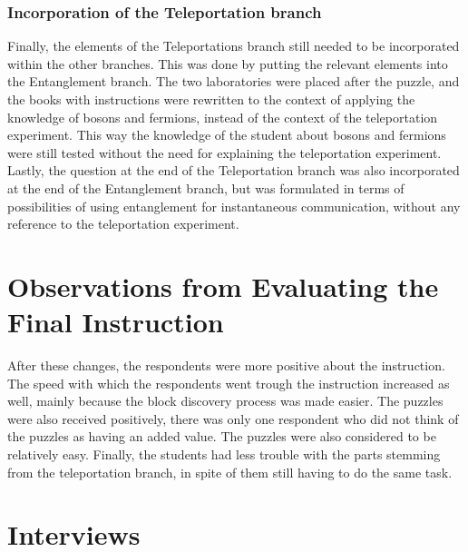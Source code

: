 \documentclass[11pt,twoside]{report} %
\begin{document}
\subsubsection{Incorporation of the Teleportation branch}

Finally, the elements of the Teleportations branch still needed to be incorporated within the other branches. This was done by putting the relevant elements into the Entanglement branch. The two laboratories were placed after the puzzle, and the books with instructions were rewritten to the context of applying the knowledge of bosons and fermions, instead of the context of the teleportation experiment. This way the knowledge of the student about bosons and fermions were still tested without the need for explaining the teleportation experiment. Lastly, the question at the end of the Teleportation branch was also incorporated at the end of the Entanglement branch, but was formulated in terms of possibilities of using entanglement for instantaneous communication, without any reference to the teleportation experiment.

\section{Observations from Evaluating the Final Instruction}

After these changes, the respondents were more positive about the instruction. The speed with which the respondents went trough the instruction increased as well, mainly because the block discovery process was made easier. The puzzles were also received positively, there was only one respondent who did not think of the puzzles as having an added value. The puzzles were also considered to be relatively easy. Finally, the students had less trouble with the parts stemming from the teleportation branch, in spite of them still having to do the same task.

\section{Interviews}
\end{document}
